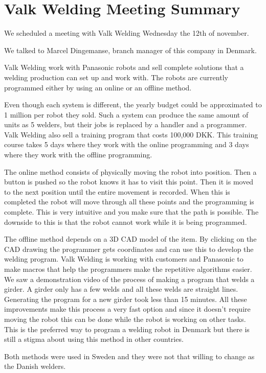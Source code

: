 \section{Valk Welding Meeting Summary}\label{Valk_meeting_resume}
We scheduled a meeting with Valk Welding Wednesday the 12th of november.

We talked to Marcel Dingemanse, branch manager of this company in Denmark.

Valk Welding work with Panasonic robots and sell complete solutions that a welding production can set up and work with. 
The robots are currently programmed either by using an online or an offline method. 
 
Even though each system is different, the yearly budget could be approximated to 1 million per robot they sold.
Such a system can produce the same amount of units as 5 welders, but their jobs is replaced by a handler and a programmer. 
Valk Welding also sell a training program that costs 100,000 DKK.
This training course takes 5 days where they work with the online programming and 3 days where they work with the offline programming.

The online method consists of physically moving the robot into position. Then a button is pushed so the robot knows it has to visit this point.
Then it is moved to the next position until the entire movement is recorded.
When this is completed the robot will move through all these points and the programming is complete.
This is very intuitive and you make sure that the path is possible.
The downside to this is that the robot cannot work while it is being programmed.

The offline method depends on a 3D CAD model of the item. 
By clicking on the CAD drawing the programmer gets coordinates and can use this to develop the welding program.
Valk Welding is working with customers and Panasonic to make macros that help the programmers make the repetitive algorithms easier.
We saw a demonstration video of the process of making a program that welds a girder. 
A girder only has a few welds and all these welds are straight lines. 
Generating the program for a new girder took less than 15 minutes. 
All these improvements make this process a very fast option and since it doesn't require moving the robot this can be done while the robot is working on other tasks.
This is the preferred way to program a welding robot in Denmark but there is still a stigma about using this method in other countries.

Both methods were used in Sweden and they were not that willing to change as the Danish welders.


